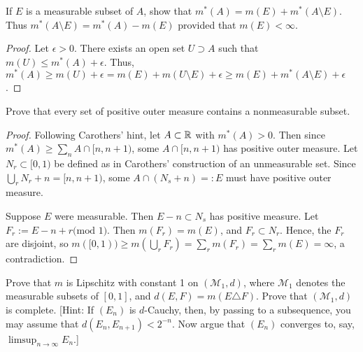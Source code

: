 \documentclass{article}
\begin{document}
 If $E$ is a measurable subset of $A$, show that $m^*(A) = m(E) + m^*(A \setminus E)$. Thus $m^*(A \setminus E) = m^*(A) - m(E)$ provided that $m(E) < \infty$.
\begin{proof}
Let $\epsilon > 0$. There exists an open set $U \supset A$ such that $m(U) \le m^*(A) + \epsilon$. Thus, $m^*(A) \ge m(U) + \epsilon = m(E) + m(U\setminus E) + \epsilon \ge m(E) + m^*(A\setminus E) + \epsilon$.
\end{proof}
 Prove that every set of positive outer measure contains a nonmeasurable subset.
\begin{proof}
Following Carothers' hint, let $A \subset \mathbb{R}$ with $m^*(A) > 0$. Then since $m^*(A) \ge \sum_n A \cap [n, n+1)$, some $A \cap [n, n+1)$ has positive outer measure. Let $N_r \subset [0,1)$ be defined as in Carothers' construction of an unmeasurable set. Since $\bigcup_r N_r + n = [n, n+1)$, some $A \cap (N_s +n) =: E$ must have positive outer measure. 

Suppose $E$ were measurable. Then $E - n \subset N_s$ has positive measure. Let $F_r := E - n + r \text{(mod 1)}$. Then $m(F_r) = m(E)$, and $F_r \subset N_r$. Hence, the $F_r$ are disjoint, so $m([0,1))  \geq m(\bigcup_r F_r) = \sum_r m(F_r) = \sum_r m(E) = \infty$, a contradiction.
\end{proof}
 Prove that $m$ is Lipschitz with constant 1 on $(\mathcal{M}_1, d)$, where $\mathcal{M}_1$ denotes the measurable subsets of $[0,1]$, and $d(E,F) = m(E\triangle F)$. Prove that $(\mathcal M_1, d)$ is complete. [Hint: If $(E_n)$ is $d$-Cauchy, then, by passing to a subsequence, you may assume that $d(E_n, E_{n+1}) < 2^{-n}$. Now argue that $(E_n)$ converges to, say, $\limsup_{n \rightarrow \infty}E_n$.]
\end{document}
